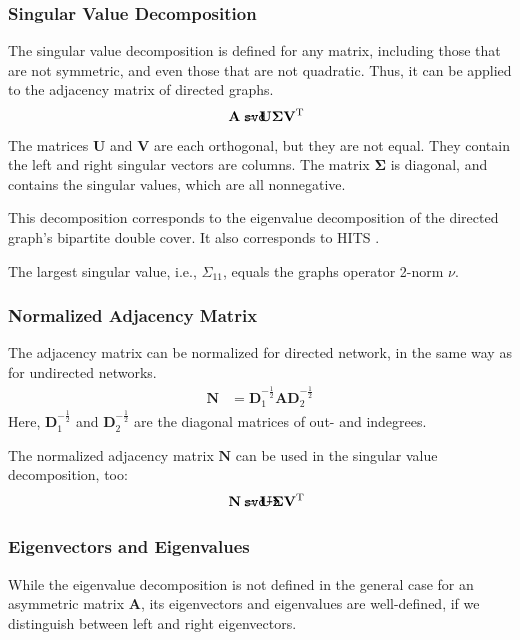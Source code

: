 \documentclass{article}
\def\mathnote#1{%
  \tag*{\rlap{\hspace\marginparsep\smash{\parbox[t]{\marginparwidth}{#1}}}}
}
\begin{document}
\subsubsection{Singular Value Decomposition}
\label{sec:matrix.svd}
The singular value decomposition is defined for any matrix, including
those that are not symmetric, and even those that are not quadratic.
Thus, it can be applied to the adjacency matrix of directed graphs. 
\begin{align}
  \mathnote{\texttt{svd}}
  \mathbf A &= \mathbf U \mathbf \Sigma \mathbf V^{\mathrm T}
\end{align}
The matrices $\mathbf U$ and $\mathbf V$ are each orthogonal, but they
are not equal.  They contain the left and right singular vectors are
columns.  The matrix $\mathbf \Sigma$ is diagonal, and contains the
singular values, which are all nonnegative. 

This decomposition corresponds to the eigenvalue decomposition of the
directed graph's bipartite double cover. 
It also corresponds to HITS \citep[Hyperlink-Induced Topic Search, ][]{b27}.

The largest singular value, i.e., $\Sigma_{11}$, equals the graphs
operator 2-norm $\nu$. 

\subsubsection{Normalized Adjacency Matrix}
\label{sec:decomposition.svd-n}
The adjacency matrix can be normalized for directed network, in the same
way as for undirected networks.
\begin{align}
  \mathbf N &= \mathbf D_1^{-\frac 1 2} \mathbf A \mathbf D_2^{-\frac 1 2}
\end{align}
Here, $\mathbf D_1^{-\frac 1 2}$ and $\mathbf D_2^{-\frac 1 2}$
are the diagonal matrices of out- and indegrees. 

The normalized adjacency matrix $\mathbf N$ can be used in the singular
value decomposition, too:
\begin{align}
  \mathnote{\texttt{svd-n}}
  \mathbf N &= \mathbf U \mathbf \Sigma \mathbf V^{\mathrm T}
\end{align}

\subsubsection{Eigenvectors and Eigenvalues}
\label{sec:matrix.diag}
While the eigenvalue decomposition is not defined in the general case
for an asymmetric matrix $\mathbf A$, its eigenvectors and eigenvalues
are well-defined, if we distinguish between left and right
eigenvectors.
\end{document}
